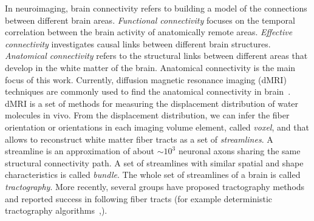 In neuroimaging, brain connectivity refers to building a model of the connections between different brain areas. \textit{Functional connectivity} focuses on the temporal correlation between the brain activity of anatomically remote areas. \textit{Effective connectivity} investigates causal links between different brain structures. \textit{Anatomical connectivity} refers to the structural links between different areas that develop in the white matter of the brain. Anatomical connectivity is the main focus of this work. 
Currently, diffusion magnetic resonance imaging (dMRI) techniques are commonly used to find the anatomical connectivity in brain~\cite{basser1994diffusion,tuch2002high}. dMRI is a set of methods for measuring the displacement distribution of water molecules in vivo. From the displacement distribution, we can infer the fiber orientation or orientations in each imaging volume element, called \emph{voxel}, and that allows to reconstruct white matter fiber tracts as a set of \emph{streamlines}. A streamline is an approximation of about $\sim10^3$ neuronal axons sharing the same structural connectivity path. A set of streamlines with similar spatial and shape characteristics is called \emph{bundle}. The whole set of streamlines of a brain is called \emph{tractography}. More recently, several groups have proposed tractography methods and reported success in following fiber tracts (for example deterministic tractography algorithms~\cite{mori2002fiber},\cite{garyfallidis2012towards}). 
